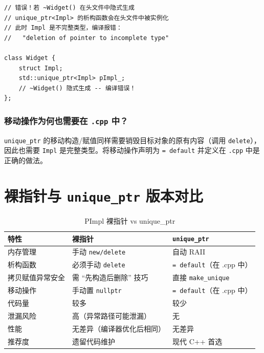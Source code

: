 \documentclass[12pt,a4paper,fontset=fandol]{ctexbook}
\begin{document}
\begin{lstlisting}[caption={常见错误：不完整类型的析构}]
// 错误！若 ~Widget() 在头文件中隐式生成
// unique_ptr<Impl> 的析构函数会在头文件中被实例化
// 此时 Impl 是不完整类型，编译报错：
//   "deletion of pointer to incomplete type"

class Widget {
    struct Impl;
    std::unique_ptr<Impl> pImpl_;
    // ~Widget() 隐式生成 -- 编译错误！
};
\end{lstlisting}

\subsubsection{移动操作为何也需要在 \texttt{.cpp} 中？}

\texttt{unique\_ptr} 的移动构造/赋值同样需要销毁目标对象的原有内容（调用 \texttt{delete}），因此也需要 \texttt{Impl} 是完整类型。将移动操作声明为 \texttt{= default} 并定义在 \texttt{.cpp} 中是正确的做法。

\newpage

\section{裸指针与 \texttt{unique\_ptr} 版本对比}

\begin{table}[h]
\centering
\caption{PImpl 裸指针 vs unique\_ptr}
\label{tab:pimpl-compare}
\begin{tabular}{@{}lll@{}}
\toprule
\textbf{特性} & \textbf{裸指针} & \textbf{\texttt{unique\_ptr}} \\
\midrule
内存管理        & 手动 \texttt{new/delete}      & 自动 RAII \\
析构函数        & 必须手动 \texttt{delete}      & \texttt{= default}（在 .cpp 中） \\
拷贝赋值异常安全 & 需 ``先构造后删除'' 技巧      & 直接 \texttt{make\_unique} \\
移动操作        & 手动置 \texttt{nullptr}       & \texttt{= default}（在 .cpp 中） \\
代码量          & 较多                          & 较少 \\
泄漏风险        & 高（异常路径可能泄漏）        & 无 \\
性能            & 无差异（编译器优化后相同）    & 无差异 \\
推荐度          & 遗留代码维护                  & 现代 C++ 首选 \\
\bottomrule
\end{tabular}
\end{table}
\end{document}
